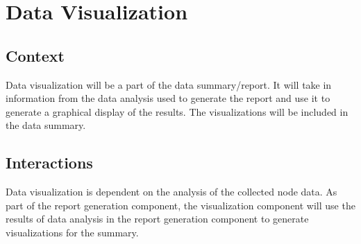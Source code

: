 \documentclass[onecolumn, draftclsnofoot,10pt, compsoc]{IEEEtran}
\begin{document}
\section{Data Visualization}
\subsection{Context}
Data visualization will be a part of the data summary/report. It will take in information from the data analysis used to generate the report and use it to generate a graphical display of the results. The visualizations will be included in the data summary.

\subsection{Interactions}
Data visualization is dependent on the analysis of the collected node data. As part of the report generation component, the visualization component will use the results of data analysis in the report generation component to generate visualizations for the summary.
\end{document}
